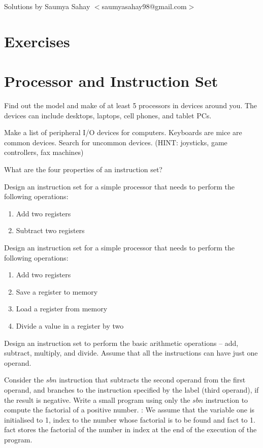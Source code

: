 \vskip 1cm
 \begin{flushright}
Solutions by Saumya Sahay $<$saumyasahay98@gmail.com$>$
\end{flushright}
 
\section*{Exercises}
\vskip 1cm
                                                                                     

\section*{Processor and Instruction Set}

\begin{ExerciseList}
\Exercise
Find out the model and make of at least 5 processors in devices around you. The devices can
include desktops, laptops, cell phones, and tablet PCs. 

\Exercise
Make a list of peripheral I/O devices for computers. Keyboards are mice are common devices.
Search for uncommon devices. (HINT: joysticks, game controllers, fax machines)

\Exercise
What are the four properties of an instruction set?

\Exercise
Design an instruction set for a simple processor that needs to perform the following
operations: 
\begin{enumerate}
\item Add two registers
\item Subtract two registers
\end{enumerate}

\Exercise
Design an instruction set for a simple processor that needs to perform the following
operations: 

\begin{enumerate}
\item Add two registers
\item Save a register to memory
\item Load a register from memory
\item Divide a value in a register by two
\end{enumerate}

\Exercise
Design an instruction set
to perform the basic arithmetic operations -- add, subtract, multiply, and divide. 
Assume that all the instructions can have just one operand.

\Exercise[difficulty=1]
Consider the $sbn$ instruction that subtracts the second operand from the first operand,
and branches to the instruction specified by the label (third operand), if the result is negative.
Write a small program using only the $sbn$ instruction to compute the factorial of a positive
number. 
\Answer:
We assume that the variable one is initialised to 1, index to the number whose factorial is to be found and fact to 1.
fact stores the factorial of the number in index at the end of the execution of the program.


\end{ExerciseList}
